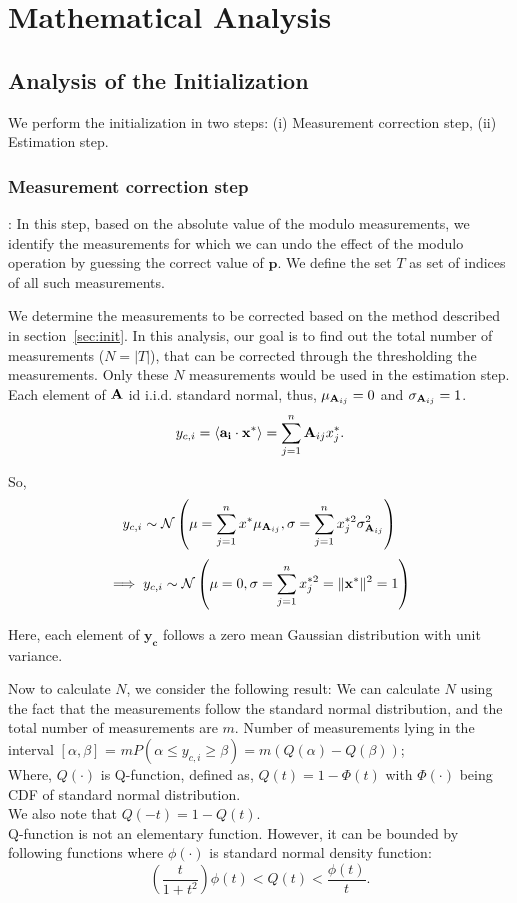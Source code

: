 \newpage

\section{Mathematical Analysis}

\subsection{Analysis of the Initialization}
We perform the initialization in two steps:
(i) Measurement correction step, (ii) Estimation step.

\subsubsection{Measurement correction step}\label{meascorr}: In this step, based on the absolute value of the modulo measurements, we identify the measurements for which we can undo the effect of the modulo operation by guessing the correct value of $\mathbf{p}$. We define the set $T$ as set of indices of all such measurements.

We determine the measurements to be corrected based on the method described in section~\ref{sec:init}. 
In this analysis, our goal is to find out the total number of measurements ($N=|T|$), that can be corrected through the thresholding the measurements. Only these $N$ measurements would be used in the estimation step.
Each element of $\mathbf{A}$ id i.i.d. standard normal, thus, $\mu_{\mathbf{A}_{ij}} = 0$ and $\sigma_{\mathbf{A}_{ij}}=1$.
$$
y_{c,i} =\langle \mathbf{a_i} \cdot \mathbf{x^*} \rangle = \sum_{j=1}^{n}\mathbf{A}_{ij}x^*_{j}.
$$

So, 
$$
y_{c,i} \sim \mathcal{N}\left(\mu= \sum_{j=1}^{n}x^{*}\mu_{\mathbf{A}_{ij}}, \sigma =\sum_{j=1}^{n}x^{*2}_{j}\sigma^2_{\mathbf{A}_{ij}}\right)
$$
$$
\implies y_{c,i} \sim \mathcal{N}\left(\mu= 0, \sigma =\sum_{j=1}^{n}x^{*2}_{j} = \|\mathbf{{x}^*}\|^2 = 1 \right)
$$

Here, each element of $\mathbf{y_c}$ follows a zero mean Gaussian distribution with unit variance.

Now to calculate $N$, we consider the following result:
We can calculate $N$ using the fact that the measurements follow the standard normal distribution, and the total number of measurements are $m$.
Number of measurements lying in the interval $[\alpha,\beta]$ = $mP(\alpha \leq y_{c,i}\geq \beta) = m\left(Q(\alpha)- Q(\beta)\right)$; \\
Where, $Q(\cdot)$ is Q-function, defined as, $Q(t) = 1-\Phi(t)$ with $\Phi(\cdot)$ being CDF of standard normal distribution. \\
We also note that $Q(-t) = 1 - Q(t)$. \\
Q-function is not an elementary function. However, it can be bounded by following functions where $\phi(\cdot)$ is standard normal density function:
$$
\left(\frac{t}{1+t^2}\right)\phi(t) < Q(t) < \frac{\phi(t)}{t}.
$$

